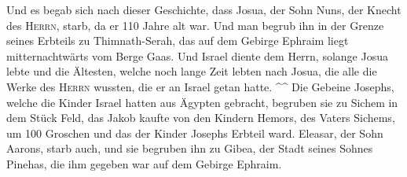  Und es begab sich nach dieser Geschichte, dass Josua,
der Sohn Nuns, der Knecht des \textsc{Herrn}, starb, da er 110 Jahre alt
war.  Und man begrub ihn in der Grenze seines Erbteils zu
Thimnath-Serah, das auf dem Gebirge Ephraim liegt mitternachtwärts vom
Berge Gaas.  Und Israel diente dem Herrn, solange Josua
lebte und die Ältesten, welche noch lange Zeit lebten nach Josua, die
alle die Werke des \textsc{Herrn} wussten, die er an Israel getan hatte.
\^{}\^{}  Die Gebeine Josephs, welche die Kinder Israel
hatten aus Ägypten gebracht, begruben sie zu Sichem in dem Stück Feld,
das Jakob kaufte von den Kindern Hemors, des Vaters Sichems, um 100
Groschen und das der Kinder Josephs Erbteil ward. 
Eleasar, der Sohn Aarons, starb auch, und sie begruben ihn zu Gibea, der
Stadt seines Sohnes Pinehas, die ihm gegeben war auf dem Gebirge
Ephraim.
